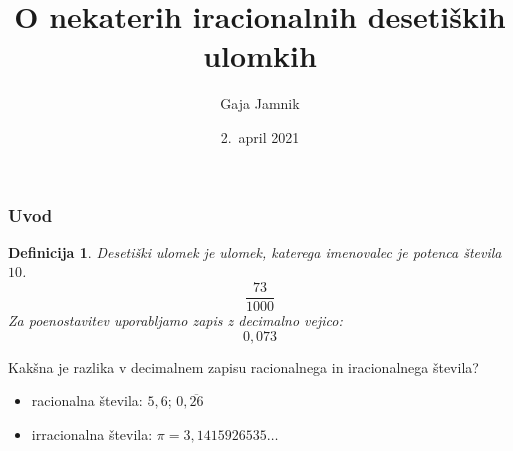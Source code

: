 \documentclass{beamer}
\title{O nekaterih iracionalnih desetiških ulomkih}
\author{Gaja Jamnik}
\institute{Fakulteta za matematiko in fiziko \\
Oddelek za matematiko}
\date{2.\ april 2021}
\newtheorem{definicija}{Definicija}
\begin{document}
    

\begin{frame}
    \titlepage
\end{frame}



\begin{frame}
    \frametitle{Uvod}
    \begin{definicija}
        \alert{Desetiški ulomek}
        je ulomek, katerega imenovalec je potenca števila $10$.
        \[ \frac{73}{1000}\]
        Za poenostavitev uporabljamo zapis z decimalno vejico:
        \[ 0,073\]
    \end{definicija}

    \pause

    Kakšna je razlika v decimalnem zapisu racionalnega in iracionalnega števila?


    \pause
    \begin{itemize}
        \item racionalna števila: $5,6$;  $0,\overline{26}$
        \item irracionalna števila: $\pi = 3,1415926535 \dots$
    \end{itemize}
\end{frame}

\end{document}
